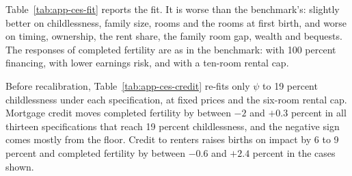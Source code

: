 
Table~\ref{tab:app-ces-fit} reports the fit. It is worse than the
benchmark's: slightly better on childlessness, family size, rooms and the
rooms at first birth, and worse on timing, ownership, the rent share, the
family room gap, wealth and bequests. The responses of completed fertility
are as in the benchmark: \cesLTVhundred{} with 100 percent financing,
\cesLowerRisk{} with lower earnings risk, and \cesCapTen{} with a ten-room
rental cap.

\begin{table}[t]
\centering
\caption{CES variant: targets and fit}
\label{tab:app-ces-fit}
\small
\begin{minipage}[t]{0.66\linewidth}\vspace{0pt}

\end{minipage}\hfill
\begin{minipage}[t]{0.3\linewidth}\vspace{0pt}

\end{minipage}
\end{table}

Before recalibration, Table~\ref{tab:app-ces-credit} re-fits only $\psi$ to
19 percent childlessness under each specification, at fixed prices and the
six-room rental cap. Mortgage credit moves completed fertility by between $-2$
and $+0.3$ percent in all thirteen specifications that reach 19 percent
childlessness, and the negative sign comes mostly from the floor. Credit to
renters raises births on impact by 6 to 9 percent and completed fertility by
between $-0.6$ and $+2.4$ percent in the cases shown.

